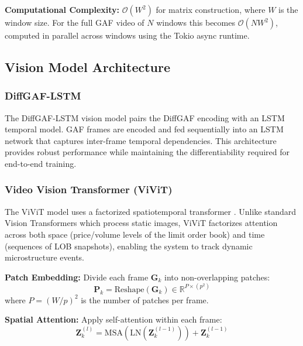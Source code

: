 \documentclass[12pt, a4paper]{article}
\begin{document}
\noindent\textbf{Computational Complexity:} $\mathcal{O}(W^2)$ for matrix construction, where $W$ is the window size. For the full GAF video of $N$ windows this becomes $\mathcal{O}(NW^2)$, computed in parallel across windows using the Tokio async runtime.

\subsection{Vision Model Architecture}
\label{sec:vision_models}

\subsubsection{DiffGAF-LSTM}
\label{sec:diffgaf_lstm}

The DiffGAF-LSTM vision model pairs the DiffGAF encoding with an LSTM temporal model. GAF frames are encoded and fed sequentially into an LSTM network that captures inter-frame temporal dependencies. This architecture provides robust performance while maintaining the differentiability required for end-to-end training.

\subsubsection{Video Vision Transformer (ViViT)}
\label{sec:vivit}

The ViViT model uses a factorized spatiotemporal transformer \citep{arnab2021vivit}. Unlike standard Vision Transformers \citep{dosovitskiy2020image} which process static images, ViViT factorizes attention across both space (price/volume levels of the limit order book) and time (sequences of LOB snapshots), enabling the system to track dynamic microstructure events.

\textbf{Patch Embedding:}
Divide each frame $\mathbf{G}_k$ into non-overlapping patches:
\begin{equation}
	\mathbf{P}_k = \text{Reshape}(\mathbf{G}_k) \in \mathbb{R}^{P \times (p^2)}
\end{equation}
where $P = {(W/p)}^2$ is the number of patches per frame.

\textbf{Spatial Attention:}
Apply self-attention within each frame:
\begin{equation}
	\mathbf{Z}^{(l)}_k = \text{MSA}(\text{LN}(\mathbf{Z}^{(l-1)}_k)) + \mathbf{Z}^{(l-1)}_k
\end{equation}
\end{document}
